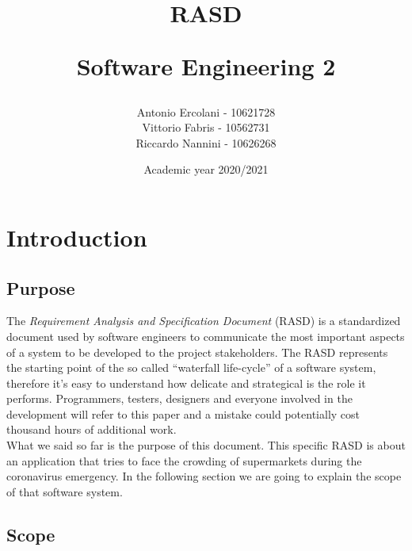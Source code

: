 \documentclass[]{article}
\title{ RASD \\
	\begin{large} 
		Software Engineering 2
	\end{large}}
\author{Antonio Ercolani - 10621728\\Vittorio Fabris - 10562731\\Riccardo Nannini - 10626268}
\date{Academic year 2020/2021}
\begin{document}
	
	\maketitle
	\begin{paragraph}
		\newline
	\end{paragraph}

	\newpage


	\tableofcontents
	
	\newpage
	
	
	\section{Introduction}
	
	\subsection{Purpose}
	
	The \textit{Requirement Analysis and Specification Document} (RASD) is a standardized document used by software engineers to communicate the most important aspects of a system to be developed to the project stakeholders. The RASD represents the starting point of the so called “waterfall life-cycle” of a software system, therefore it’s easy to understand how delicate and strategical is the role it performs. Programmers, testers, designers and everyone involved in the development will refer to this paper and a mistake could potentially cost thousand hours of additional work. 
	\smallskip
	\\
	What we said so far is the purpose of this document. This specific RASD is about an application that tries to face the crowding of supermarkets during the coronavirus emergency. In the following section we are going to explain the scope of that software system.

	\subsection{Scope}
	
\end{document}
